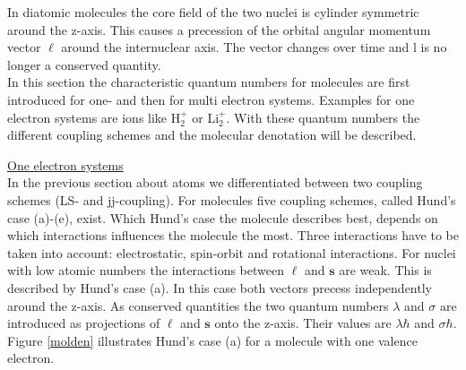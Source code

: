 \documentclass[parskip,12pt,headsepline,a4paper] {scrbook}
\begin{document}


In diatomic molecules the core field of the two nuclei is cylinder symmetric around the z-axis. This causes a precession of the orbital angular momentum vector $\boldsymbol{\ell}$ around the internuclear axis. The vector changes over time and l is no longer a conserved quantity. \\
In this section the characteristic quantum numbers for molecules are first introduced for one- and then for multi electron systems. Examples for one electron systems are ions like H$^+_2$ or Li$^+_2$. With these quantum numbers the different coupling schemes and the molecular denotation will be described.


\underline{One electron systems} \\
In the previous section about atoms we differentiated between two coupling schemes (LS- and jj-coupling). For molecules five coupling schemes, called Hund's case (a)-(e), exist. Which Hund's case the molecule describes best, depends on which interactions influences the molecule the most. Three interactions have to be taken into account: electrostatic, spin-orbit and rotational interactions.
For nuclei with low atomic numbers the interactions between $\boldsymbol{\ell}$ and $\mathbf{s}$ are weak. This is described by Hund's case (a). In this case both vectors precess independently around the z-axis. As conserved quantities the two quantum numbers $\lambda$ and $\sigma$ are introduced as projections of $\boldsymbol{\ell}$ and $\mathbf{s}$ onto the z-axis. Their values are $\lambda \hbar$ and $\sigma \hbar$. Figure \ref{molden} illustrates Hund's case (a) for a molecule with one valence electron.
\end{document}
